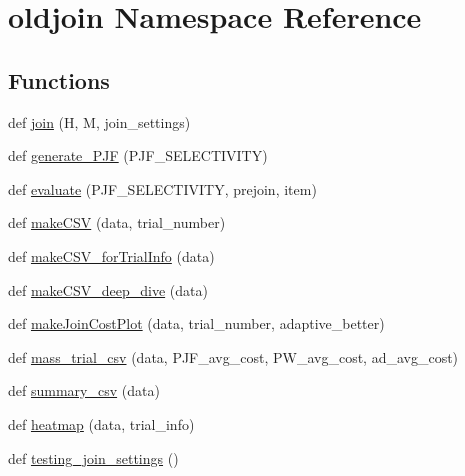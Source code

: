 \hypertarget{namespaceoldjoin}{}\section{oldjoin Namespace Reference}
\label{namespaceoldjoin}
\subsection*{Functions}
\begin{DoxyCompactItemize}
\item 
def \mbox{\hyperlink{namespaceoldjoin_a8636d8a4fb507de47bd554ef95397533}{join}} (H, M, join\+\_\+settings)
\item 
def \mbox{\hyperlink{namespaceoldjoin_ab07f8db55282bc2c19e5c6ddbdfb820a}{generate\+\_\+\+P\+JF}} (P\+J\+F\+\_\+\+S\+E\+L\+E\+C\+T\+I\+V\+I\+TY)
\item 
def \mbox{\hyperlink{namespaceoldjoin_a8b76cd232f566a0726e27b9e31cdd045}{evaluate}} (P\+J\+F\+\_\+\+S\+E\+L\+E\+C\+T\+I\+V\+I\+TY, prejoin, item)
\item 
def \mbox{\hyperlink{namespaceoldjoin_ad2ce1a61d9eb32b5e5caedc2b9783a17}{make\+C\+SV}} (data, trial\+\_\+number)
\item 
def \mbox{\hyperlink{namespaceoldjoin_a57cd17251a242e4b70c053b463abc920}{make\+C\+S\+V\+\_\+for\+Trial\+Info}} (data)
\item 
def \mbox{\hyperlink{namespaceoldjoin_af8c01b7cf6d0ed355ba3bd5ce60b92fe}{make\+C\+S\+V\+\_\+deep\+\_\+dive}} (data)
\item 
def \mbox{\hyperlink{namespaceoldjoin_acd67830af4aecf91efa9c32ba4ad060a}{make\+Join\+Cost\+Plot}} (data, trial\+\_\+number, adaptive\+\_\+better)
\item 
def \mbox{\hyperlink{namespaceoldjoin_a3c1f060ef4b4343cdc4231fbccfeadb9}{mass\+\_\+trial\+\_\+csv}} (data, P\+J\+F\+\_\+avg\+\_\+cost, P\+W\+\_\+avg\+\_\+cost, ad\+\_\+avg\+\_\+cost)
\item 
def \mbox{\hyperlink{namespaceoldjoin_a7df1afa3b1e7e79e86d2db42e625ec70}{summary\+\_\+csv}} (data)
\item 
def \mbox{\hyperlink{namespaceoldjoin_ad1782de5b29177d53cd9ddf8972eee3c}{heatmap}} (data, trial\+\_\+info)
\item 
def \mbox{\hyperlink{namespaceoldjoin_ac193a15973e01b8bb951196afc933711}{testing\+\_\+join\+\_\+settings}} ()
\end{DoxyCompactItemize}
